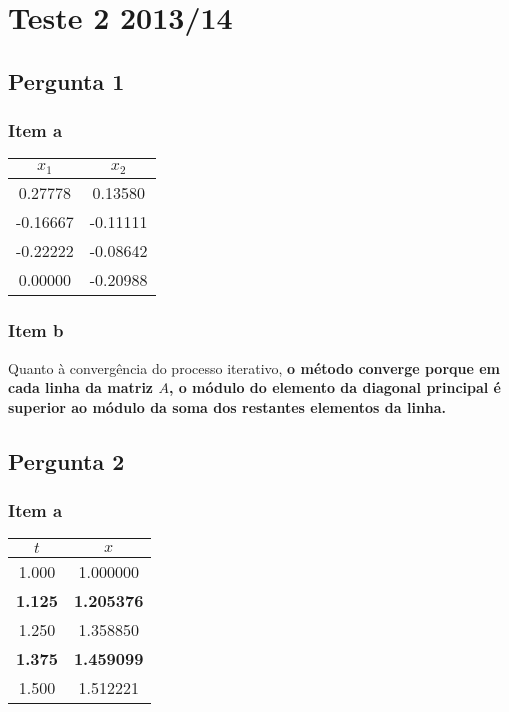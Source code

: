 \setcounter{chapter}{12}
\chapter{Teste 2 2013/14}
{
\renewcommand{\thesubsection}{\thesection\alph{subsection}}
\section{Pergunta 1}

\subsection{Item a}
\begin{center} \begin{tabular}{c | c}
	$x_1$ & $x_2$ \\ \hline
	0.27778  &      0.13580 \\
	-0.16667 &      -0.11111 \\
	-0.22222 &      -0.08642 \\
	0.00000  &      -0.20988
\end{tabular} \end{center}
\subsection{Item b}
Quanto à convergência do processo iterativo, \textbf{o método converge porque em cada linha da matriz $A$, o módulo do elemento da diagonal principal é superior ao módulo da soma dos restantes elementos da linha.}

\section{Pergunta 2}

\subsection{Item a}
\begin{center} \begin{tabular}{c | c}
	$t$ & $x$ \\ \hline
	1.000 & 1.000000 \\
	\textbf{1.125} & \textbf{1.205376} \\
	1.250 & 1.358850 \\
	\textbf{1.375} & \textbf{1.459099} \\
	1.500 & 1.512221
\end{tabular} \end{center}
}
